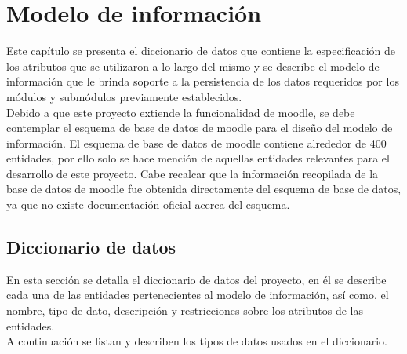 \section{Modelo de información}
\label{ch:dominioDatos}

 Este capítulo se presenta el diccionario de datos que contiene la especificación de los
 atributos que se utilizaron a lo largo del mismo y se describe el modelo
 de información que le brinda soporte a la persistencia de los datos requeridos
 por los módulos y submódulos previamente establecidos.\\

 \noindent Debido a que este proyecto extiende la funcionalidad de moodle,
 se debe contemplar el esquema de base de datos de moodle para el diseño del modelo de información.
 El esquema de base de datos de moodle contiene alrededor de 400 entidades, por ello solo se hace mención de aquellas
 entidades relevantes para el desarrollo de este proyecto. Cabe recalcar que la información
 recopilada de la base de datos de moodle fue obtenida
 directamente del esquema de base de datos, ya que no existe documentación oficial acerca
 del esquema.

\subsection{Diccionario de datos}

 En esta sección se detalla el diccionario de datos del proyecto, en él se describe cada una
 de las entidades pertenecientes al modelo de información, así como, el nombre, tipo de dato,
 descripción y restricciones sobre los atributos de las entidades.\\

 A continuación se listan y describen los tipos de
 datos usados en el diccionario.

